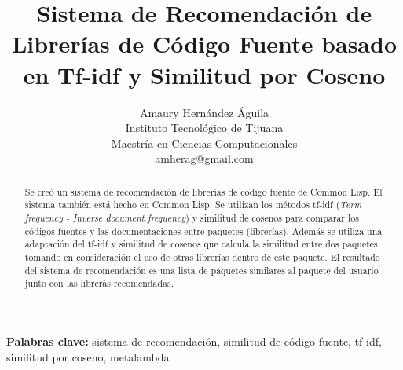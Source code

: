 \documentclass[times, 10pt,twocolumn, a4paper]{article}
\begin{document}
\title{Sistema de Recomendaci\'on de Librer\'ias de C\'odigo Fuente
  basado en Tf-idf y Similitud por Coseno}

\author{Amaury Hern\'andez \'Aguila\\
  Instituto Tecnol\'ogico de Tijuana\\
  Maestr\'ia en Ciencias Computacionales\\
  amherag@gmail.com\\
}

\maketitle
\thispagestyle{empty}

\begin{abstract}






  Se cre\'o un sistema de recomendaci\'on de librer\'ias de c\'odigo
  fuente de Common Lisp. El sistema tambi\'en est\'a hecho en Common
  Lisp. Se utilizan los m\'etodos tf-idf (\textit{Term frequency -
    Inverse document frequency}) y similitud de cosenos para
  comparar los c\'odigos fuentes y las documentaciones entre paquetes
  (librer\'ias). Adem\'as se utiliza una adaptaci\'on del tf-idf y
  similitud de cosenos que calcula la similitud entre dos paquetes
  tomando en consideraci\'on el uso de otras librer\'ias dentro de
  este paquete. El resultado del sistema de recomendaci\'on es una
  lista de paquetes similares al paquete del usuario junto con las librer\'as recomendadas.
\end{abstract}

\begin{center}
\textbf{Palabras clave:} sistema de recomendaci\'on, similitud de
c\'odigo fuente, tf-idf, similitud por coseno, metalambda
\end{center}
\end{document}
